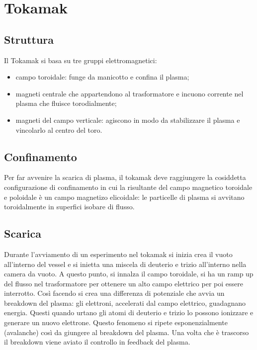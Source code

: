 \documentclass{article}
\begin{document}
\newtheorem{definizione}{Definizione}

\tableofcontents
\section{Tokamak}
\subsection{Struttura}
Il Tokamak si basa su tre gruppi elettromagnetici:\begin{itemize}
    \item campo toroidale: funge da manicotto e confina il plasma;
    \item magneti centrale che appartendono al trasformatore e incuono corrente nel plasma che fluisce torodialmente;
    \item magneti del campo verticale: agiscono in modo da stabilizzare il plasma e vincolarlo al centro del toro.
\end{itemize}
\subsection{Confinamento}
Per far avvenire la scarica di plasma, il tokamak deve raggiungere la cosiddetta configurazione di confinamento in cui la risultante del campo magnetico toroidale e poloidale è un campo magnetizo elicoidale: le particelle di plasma si avvitano toroidalmente in superfici isobare di flusso.
\subsection{Scarica}
Durante l'avviamento di un esperimento nel tokamak si inizia crea il vuoto all'interno del vessel e si inietta una miscela di deuterio e trizio all'interno nella camera da vuoto. A questo punto, si innalza il campo toroidale, si ha un ramp up del flusso nel trasformatore per ottenere un alto campo elettrico per poi essere interrotto. Così facendo si crea una differenza di potenziale che avvia un breakdown del plasma: gli elettroni, accelerati dal campo elettrico, guadagnano energia. Questi quando urtano gli atomi di deuterio e trizio lo possono ionizzare e generare un nuovo elettrone. Questo fenomeno si ripete esponenzialmente (avalanche) così da giungere al breakdown del plasma.\newline
Una volta che è trascorso il breakdown viene aviato il controllo in feedback del plasma.
\end{document}
